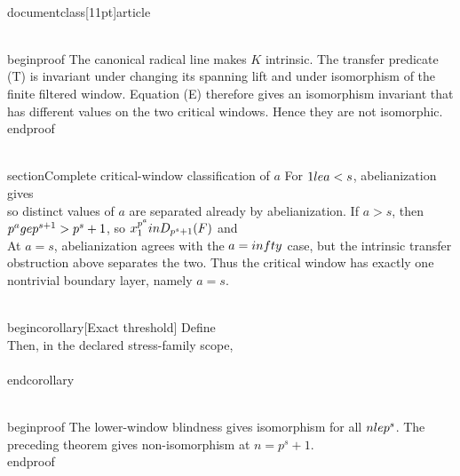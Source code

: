 \\documentclass[11pt]{article}
\begin{document}
\\begin{proof}
The canonical radical line makes $K$ intrinsic. The transfer predicate (T) is invariant under changing its spanning lift and under isomorphism of the finite filtered window. Equation (E) therefore gives an isomorphism invariant that has different values on the two critical windows. Hence they are not isomorphic.
\\end{proof}

\\section{Complete critical-window classification of $a$}
For $1\\le a<s$, abelianization gives
\\[
W_{s,a}^{\\mathrm{ab}}
\\cong
\\mathbf Z_p/p^a\\oplus
(\\mathbf Z_p/p^{s+1})^d,
\\]
so distinct values of $a$ are separated already by abelianization. If $a>s$, then
$p^a\\ge p^{s+1}>p^s+1$, so $x_1^{p^a}\\in D_{p^s+1}(F)$ and
\\[
W_{s,a}=W_{s,\\infty}.
\\]
At $a=s$, abelianization agrees with the $a=\\infty$ case, but the intrinsic transfer obstruction above separates the two. Thus the critical window has exactly one nontrivial boundary layer, namely $a=s$.

\\begin{corollary}[Exact threshold]
Define
\\[
n_{\\rm sep}(s)=
\\min\\{n:\\,
W_n(G_{s,s})\\not\\cong W_n(G_{s,\\infty})\\}.
\\]
Then, in the declared stress-family scope,
\\[
\\boxed{n_{\\rm sep}(s)=p^s+1.}
\\]
\\end{corollary}

\\begin{proof}
The lower-window blindness gives isomorphism for all $n\\le p^s$. The preceding theorem gives non-isomorphism at $n=p^s+1$.
\\end{proof}
\end{document}
